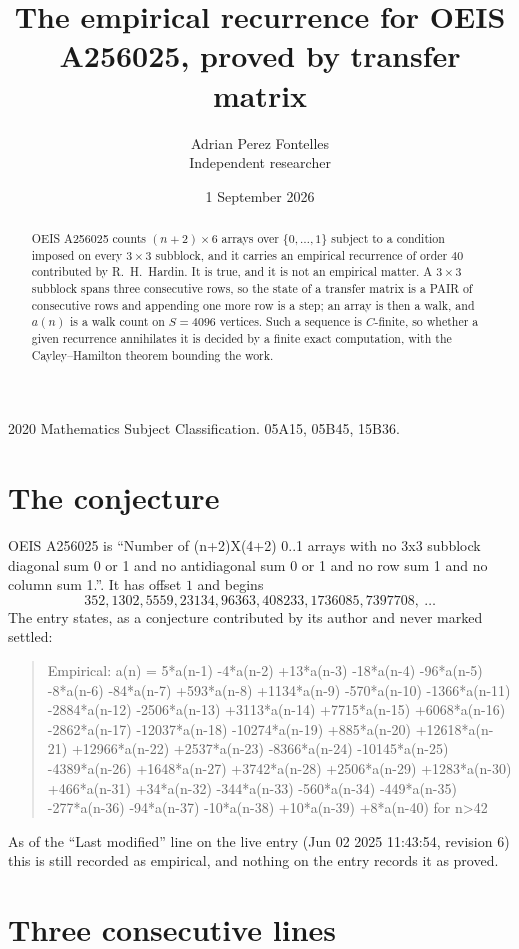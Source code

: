 \documentclass[11pt,a4paper]{article}
\title{The empirical recurrence for OEIS A256025, proved by transfer matrix}
\author{Adrian Perez Fontelles\\ \small Independent researcher}
\date{1 September 2026}
\theoremstyle{plain}
\theoremstyle{definition}
\begin{document}
\maketitle

\begin{abstract}
OEIS A256025 counts $(n+2)\times6$ arrays over $\{0,\dots,1\}$ subject to a condition imposed on
every $3\times3$ subblock, and it carries an empirical recurrence of order $40$
contributed by R.~H.~Hardin. It is true, and it is not an empirical matter. A $3\times3$
subblock spans three consecutive rows, so the state of a transfer matrix is a PAIR of
consecutive rows and appending one more row is a step; an array is then a walk, and
$a(n)$ is a walk count on $S=4096$ vertices. Such a sequence is $C$-finite, so whether a given
recurrence annihilates it is decided by a finite exact computation, with the Cayley--Hamilton
theorem bounding the work.
\end{abstract}

\noindent\small 2020 Mathematics Subject Classification. 05A15, 05B45, 15B36.\normalsize

\section{The conjecture}

OEIS A256025 is ``Number of (n+2)X(4+2) 0..1 arrays with no 3x3 subblock diagonal sum 0 or 1 and no antidiagonal sum 0 or 1 and no row sum 1 and no column sum 1.''. It has offset $1$ and begins
\[
352, 1302, 5559, 23134, 96363, 408233, 1736085, 7397708,\ \dots
\]
The entry states, as a conjecture contributed by its author and never marked settled:
\begin{quote}
Empirical: a(n) = 5*a(n-1) -4*a(n-2) +13*a(n-3) -18*a(n-4) -96*a(n-5) -8*a(n-6) -84*a(n-7) +593*a(n-8) +1134*a(n-9) -570*a(n-10) -1366*a(n-11) -2884*a(n-12) -2506*a(n-13) +3113*a(n-14) +7715*a(n-15) +6068*a(n-16) -2862*a(n-17) -12037*a(n-18) -10274*a(n-19) +885*a(n-20) +12618*a(n-21) +12966*a(n-22) +2537*a(n-23) -8366*a(n-24) -10145*a(n-25) -4389*a(n-26) +1648*a(n-27) +3742*a(n-28) +2506*a(n-29) +1283*a(n-30) +466*a(n-31) +34*a(n-32) -344*a(n-33) -560*a(n-34) -449*a(n-35) -277*a(n-36) -94*a(n-37) -10*a(n-38) +10*a(n-39) +8*a(n-40) for n>42
\end{quote}
As of the ``Last modified'' line on the live entry (Jun 02 2025 11:43:54, revision 6) this is still
recorded as empirical, and nothing on the entry records it as proved.

\section{Three consecutive lines}
\end{document}
